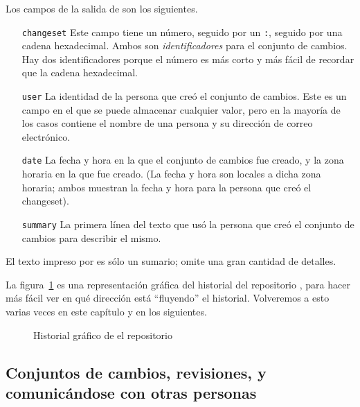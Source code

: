 Los campos de la salida de  son los siguientes.
\begin{itemize}
    \item[\texttt{changeset}]\hspace{-0.5em} Este campo
        tiene un número, seguido por un
        \texttt{:}, seguido por una cadena hexadecimal. Ambos son
        \emph{identificadores} para el conjunto de cambios. Hay dos
        identificadores porque el número es más corto y más fácil de
        recordar que la cadena hexadecimal.
        
\item[\texttt{user}]\hspace{-0.5em} La identidad de la
    persona que creó el conjunto de cambios. Este es un campo en el
    que se puede almacenar cualquier valor, pero en la mayoría de los
    casos contiene el nombre de una persona y su dirección de correo
    electrónico.
    
\item[\texttt{date}]\hspace{-0.5em} La fecha y hora en la
    que el conjunto de cambios fue creado, y la zona horaria en la que
    fue creado. (La fecha y hora son locales a dicha zona horaria;
    ambos muestran la fecha y hora para la persona que creó el
    changeset).
    
\item[\texttt{summary}]\hspace{-0.5em} 
    La primera línea del texto que usó la persona que creó el conjunto
    de cambios para describir el mismo.
\end{itemize}
El texto impreso por  es sólo un sumario; omite una gran
cantidad de detalles.

La figura~\ref{fig:tour-basic:history} es una representación
gráfica del historial del repositorio , para hacer más
fácil ver en qué dirección está ``fluyendo'' el historial. Volveremos
a esto varias veces en este capítulo y en los siguientes.

\begin{figure}[ht]
  \centering
  \caption{Historial gráfico de el repositorio }
  \label{fig:tour-basic:history}
\end{figure}

\subsection{Conjuntos de cambios, revisiones, y comunicándose con
otras personas}

